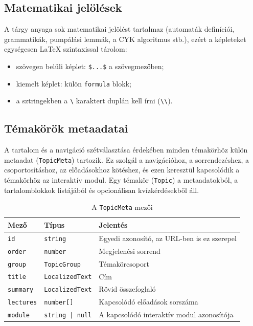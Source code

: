 \documentclass[12pt,a4paper]{report}
\begin{document}
\subsection{Matematikai jelölések}

A tárgy anyaga sok matematikai jelölést tartalmaz (automaták
definíciói, grammatikák, pumpálási lemmák, a CYK algoritmus stb.),
ezért a képleteket egységesen \LaTeX{} szintaxissal tárolom:

\begin{itemize}
    \item szövegen belüli képlet: \verb|$...$| a szövegmezőben;
    \item kiemelt képlet: külön \texttt{formula} blokk;
    \item a sztringekben a \verb|\| karaktert duplán kell írni
          (\verb|\\|).
\end{itemize}

\subsection{Témakörök metaadatai}

A tartalom és a navigáció szétválasztása érdekében minden témakörhöz
külön metaadat (\texttt{TopicMeta}) tartozik. Ez szolgál a
navigációhoz, a sorrendezéshez, a csoportosításhoz, az előadásokhoz
kötéshez, és ezen keresztül kapcsolódik a témakörhöz az
interaktív modul. Egy témakör (\texttt{Topic}) a metaadatokból, a
tartalomblokkok listájából és opcionálisan kvízkérdésekből áll.

\begin{table}[htbp]
    \centering
    \begin{tabularx}{\textwidth}{l l X}
        \toprule
        \textbf{Mező} & \textbf{Típus} & \textbf{Jelentés} \\
        \midrule
        \texttt{id}       & \texttt{string}        & Egyedi azonosító, az URL-ben is ez szerepel \\
        \texttt{order}    & \texttt{number}        & Megjelenési sorrend \\
        \texttt{group}    & \texttt{TopicGroup}    & Témakörcsoport \\
        \texttt{title}    & \texttt{LocalizedText} & Cím \\
        \texttt{summary}  & \texttt{LocalizedText} & Rövid összefoglaló \\
        \texttt{lectures} & \texttt{number[]}      & Kapcsolódó előadások sorszáma \\
        \texttt{module}   & \texttt{string | null} & A kapcsolódó interaktív modul azonosítója \\
        \bottomrule
    \end{tabularx}
    \caption{A \texttt{TopicMeta} mezői}
    \label{tab:topicmeta}
\end{table}
\end{document}
